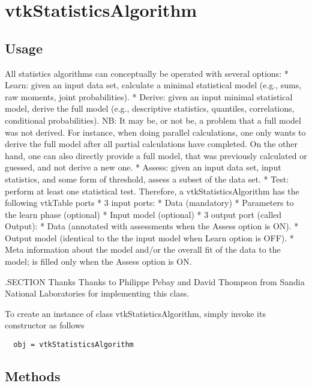\section{vtkStatisticsAlgorithm}

\subsection{Usage}

 All statistics algorithms can conceptually be operated with several options:
 * Learn: given an input data set, calculate a minimal statistical model (e.g., 
   sums, raw moments, joint probabilities).
 * Derive: given an input minimal statistical model, derive the full model 
   (e.g., descriptive statistics, quantiles, correlations, conditional
    probabilities).
   NB: It may be, or not be, a problem that a full model was not derived. For
   instance, when doing parallel calculations, one only wants to derive the full
   model after all partial calculations have completed. On the other hand, one
   can also directly provide a full model, that was previously calculated or
   guessed, and not derive a new one.
 * Assess: given an input data set, input statistics, and some form of 
   threshold, assess a subset of the data set.
 * Test: perform at least one statistical test.
 Therefore, a vtkStatisticsAlgorithm has the following vtkTable ports
 * 3 input ports:
   * Data (mandatory)
   * Parameters to the learn phase (optional)
   * Input model (optional) 
 * 3 output port (called Output):
   * Data (annotated with assessments when the Assess option is ON).
   * Output model (identical to the the input model when Learn option is OFF).
   * Meta information about the model and/or the overall fit of the data to the
     model; is filled only when the Assess option is ON.

 .SECTION Thanks
 Thanks to Philippe Pebay and David Thompson from Sandia National Laboratories 
 for implementing this class.

To create an instance of class vtkStatisticsAlgorithm, simply
invoke its constructor as follows
\begin{verbatim}
  obj = vtkStatisticsAlgorithm
\end{verbatim}
\subsection{Methods}

